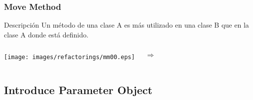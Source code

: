 ﻿\documentclass[animated,a4paper,slidestop,xcolor=pst,blue]{beamer}
\begin{document}
\begin{frame}
	\frametitle{Move Method}
	\begin{block}{Descripción}
		Un método de una clase A es más utilizado en una clase B que en la clase A donde está definido.
	\end{block}
	\begin{columns}
		\begin{center}
			\texttt{[image: images/refactorings/mm00.eps]}
		\end{center}
		\begin{center}
			\Huge $\Rightarrow$
		\end{center}
	\end{columns}
\end{frame}

\subsection{Introduce Parameter Object}

\end{document}
